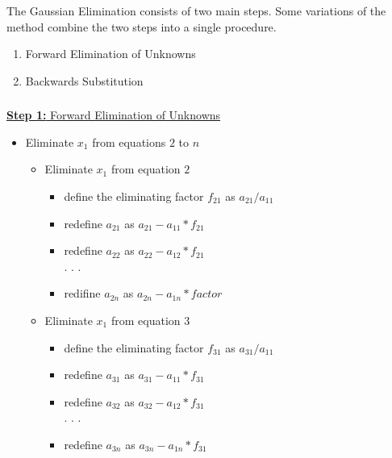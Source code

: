 \documentclass[fleqn]{beamer} %
\newcommand{\sectionIVsubsectionIItitle}{}
\begin{document}
			\begin{frame}
				\frametitle{\sectionIVsubsectionIItitle}
				\bigskip

					The Gaussian Elimination consists of two main steps. Some variations of the method combine the two steps into a single procedure. \vspace{10mm}
  
			  	\begin{enumerate}

			    	\item Forward Elimination of Unknowns
			    
			    	\item Backwards Substitution   
			  
			  	\end{enumerate} 


				\btVFill
			\end{frame}

			\begin{frame}
				\frametitle{\sectionIVsubsectionIItitle}
				\bigskip

				\underline{{\bf Step 1:} Forward Elimination of Unknowns}
		
				\begin{itemize}
					\item  Eliminate $x_1$ from equations $2$ to $n$
						\begin{itemize}
							\item Eliminate $x_1$ from equation $2$
								\begin{itemize}
									\item define the eliminating factor $f_{21}$ as $a_{21}/a_{11}$
									\item redefine $a_{21}$ as $a_{21}-a_{11}*f_{21}$
									\item redefine $a_{22}$ as $a_{22}-a_{12}*f_{21}$ \\
									. . . 
									\item redifine $a_{2n}$ as $a_{2n}-a_{1n}*factor$ \\
								\end{itemize}
							\item Eliminate $x_1$ from equation $3$
								\begin{itemize}
									\item define the eliminating factor $f_{31}$ as $a_{31}/a_{11}$
									\item redefine $a_{31}$ as $a_{31}-a_{11}*f_{31}$
									\item redefine $a_{32}$ as $a_{32}-a_{12}*f_{31}$ \\
									 . . .
									\item redefine $a_{3n}$ as $a_{3n}-a_{1n}*f_{31}$ \\
								\end{itemize}	
						\end{itemize}
				\end{itemize}

				\btVFill
			\end{frame}	
\end{document}
